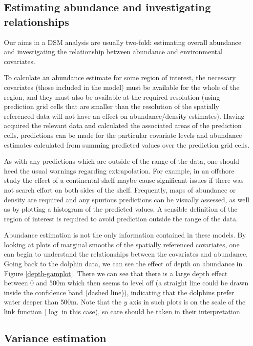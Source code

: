 \documentclass[a4paper,12pt]{article}
\begin{document}
\subsection*{Estimating abundance and investigating relationships}

Our aims in a DSM analysis are usually two-fold: estimating overall abundance and investigating the relationship between abundance and environmental covariates.

To calculate an abundance estimate for some region of interest, the necessary covariates (those included in the model) must be available for the whole of the region, and they must also be available at the required resolution (using prediction grid cells that are smaller than the resolution of the spatially referenced data will not have an effect on abundance/density estimates). Having acquired the relevant data and calculated the associated areas of the prediction cells, predictions can be made for the particular covariate levels and abundance estimates calculated from summing predicted values over the prediction grid cells. 

As with any predictions which are outside of the range of the data, one should heed the usual warnings regarding extrapolation. For example, in an offshore study the effect of a continental shelf maybe cause significant issues if there was not search effort on both sides of the shelf. Frequently,  maps of abundance or density are required and any spurious predictions can be visually assessed, as well as by plotting a histogram of the predicted values. A sensible definition of the region of interest is required to avoid prediction outside the range of the data.

Abundance estimation is not the only information contained in these models. By looking at plots of marginal smooths of the spatially referenced covariates, one can begin to understand the relationships between the covariates and abundance. Going back to the dolphin data, we can see the effect of depth on abundance in Figure \ref{depth-gamplot}. There we can see that there is a large depth effect between 0 and 500m which then seems to level off (a straight line could be drawn inside the confidence band (dashed line)), indicating that the dolphins prefer water deeper than 500m. Note that the $y$ axis in such plots is on the scale of the link function ($\log$ in this case), so care should be taken in their interpretation.

\subsection*{Variance estimation}
\end{document}
